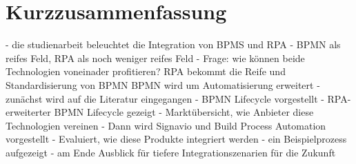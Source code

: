 \chapter*{Kurzzusammenfassung} 
- die studienarbeit beleuchtet die Integration von BPMS und RPA
- BPMN als reifes Feld, RPA als noch weniger reifes Feld
- Frage: wie können beide Technologien voneinader profitieren?
    RPA bekommt die Reife und Standardisierung von BPMN
    BPMN wird um Automatisierung erweitert
- zunächst wird auf die Literatur eingegangen
- BPMN Lifecycle vorgestellt
- RPA-erweiterter BPMN Lifecycle gezeigt
- Marktübersicht, wie Anbieter diese Technologien vereinen
- Dann wird Signavio und Build Process Automation vorgestellt
- Evaluiert, wie diese Produkte integriert werden
- ein Beispielprozess aufgezeigt
- am Ende Ausblick für tiefere Integrationszenarien für die Zukunft
